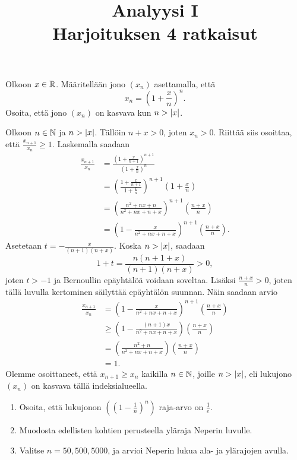 \documentclass[11pt,a4paper]{amsart}
\title{Analyysi I\\Harjoituksen 4 ratkaisut}
\author{}
\date{}
\begin{document}

\begin{exercise}
  Olkoon \(x \in \mathbb{R}\). Määritellään jono \((x_n)\) asettamalla, että
  \[
    x_n = \left(1 + \frac{x}{n}\right)^n.
  \]
  Osoita, että jono \((x_n)\) on kasvava kun \(n > \lvert x\rvert\).
\end{exercise}

\begin{solution}
  Olkoon \(n \in \mathbb{N}\) ja \(n > \lvert x\rvert\). Tällöin \(n + x > 0\), joten
  \(x_n > 0\). Riittää siis osoittaa, että \(\frac{x_{n+1}}{x_n} \geq 1\).
  Laskemalla saadaan
  \[
    \begin{aligned}
      \frac{x_{n+1}}{x_n} &= \frac{\left(1 + \frac{x}{n + 1}\right)^{n + 1}}
      {\left(1 + \frac{x}{n}\right)^n} \\
      &= \left(\frac{1 + \frac{x}{n + 1}}{1 + \frac{x}{n}}\right)^{n
      + 1}\left(1 + \frac{x}{n}\right) \\
      &= \left(\frac{n^2 + nx + n}{n^2 + nx + n + x}\right)^{n +
      1}\left(\frac{n + x}{n}\right) \\
      &= \left(1 - \frac{x}{n^2 + nx + n + x}\right)^{n +
      1}\left(\frac{n + x}{n}\right).
    \end{aligned}
  \]
  Asetetaan \(t = -\frac{x}{(n + 1)(n + x)}\). Koska \(n > \lvert x\rvert\),
  saadaan
  \[
    1 + t = \frac{n(n + 1 + x)}{(n + 1)(n + x)} > 0,
  \]
  joten \(t > -1\) ja Bernoullin epäyhtälöä voidaan soveltaa.
  Lisäksi \(\frac{n + x}{n} > 0\), joten tällä luvulla kertominen säilyttää
  epäyhtälön suunnan. Näin saadaan arvio
  \[
    \begin{aligned}
      \frac{x_{n+1}}{x_n} &=
      \left(1 - \frac{x}{n^2 + nx + n + x}\right)^{n +
      1}\left(\frac{n + x}{n}\right) \\
      &\geq \left(1 - \frac{(n + 1)x}{n^2 + nx + n +
      x}\right)\left(\frac{n + x}{n}\right) \\
      &= \left(\frac{n^2 + n}{n^2 + nx + n + x}\right)\left(\frac{n +
      x}{n}\right) \\
      &= 1.
    \end{aligned}
  \]
  Olemme osoittaneet, että \(x_{n + 1} \geq x_{n}\) kaikilla \(n \in \mathbb{N}\),
  joille \(n > \lvert x\rvert\), eli lukujono \((x_n)\) on kasvava tällä
  indeksialueella.
\end{solution}

\begin{exercise}
  \leavevmode\par
\begin{enumerate}[label=\alph*), nosep]
  \item Osoita, että lukujonon \(\left(\left(1 - \frac{1}{n}\right)^n\right)\)
    raja-arvo on \(\frac{1}{e}\).
  \item Muodosta edellisten kohtien perusteella yläraja Neperin luvulle.
  \item Valitse \(n = 50, 500, 5000\), ja arvioi Neperin lukua ala- ja
    ylärajojen avulla.
\end{enumerate}
\end{exercise}
\end{document}
